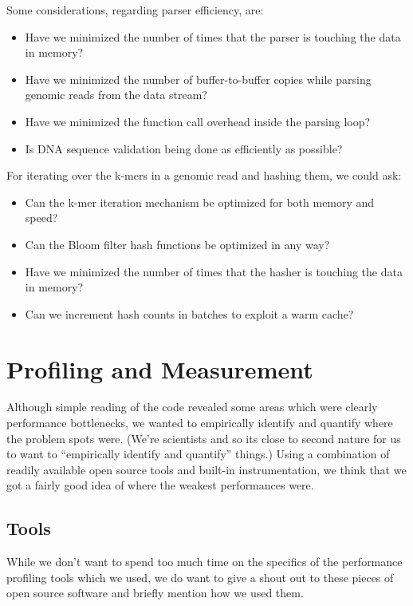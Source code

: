 \documentclass{article}
\begin{document}
Some considerations, regarding parser efficiency, are:
\begin{itemize}
\item Have we minimized the number of times that the parser is touching the data in memory?
\item Have we minimized the number of buffer-to-buffer copies while parsing genomic reads from the data stream?
\item Have we minimized the function call overhead inside the parsing loop?
\item Is DNA sequence validation being done as efficiently as possible?
\end{itemize}

For iterating over the k-mers in a genomic read and hashing them, we could ask:
\begin{itemize}
\item Can the k-mer iteration mechanism be optimized for both memory and speed?
\item Can the Bloom filter hash functions be optimized in any way?
\item Have we minimized the number of times that the hasher is touching the data in memory?
\item Can we increment hash counts in batches to exploit a warm cache?
\end{itemize}

\section{Profiling and Measurement}

Although simple reading of the code revealed some areas which were clearly performance bottlenecks, we wanted to empirically identify and quantify where the problem spots were. (We're scientists and so its close to second nature for us to want to ``empirically identify and quantify'' things.) Using a combination of readily available open source tools and built-in instrumentation, we think that we got a fairly good idea of where the weakest performances were.

\subsection{Tools}

While we don't want to spend too much time on the specifics of the performance profiling tools which we used, we do want to give a shout out to these pieces of open source software and briefly mention how we used them.
\end{document}
